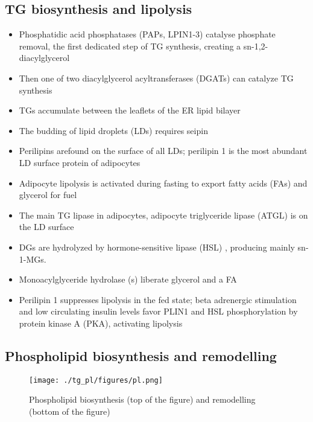 \documentclass{scrartcl}
\begin{document}
\subsection{TG biosynthesis and lipolysis}
\label{sec:orgbe94311}
\begin{itemize}
\item Phosphatidic acid phosphatases (PAPs, LPIN1-3) catalyse phosphate
removal, the first dedicated step of TG synthesis, creating a sn-1,2-diacylglycerol
\item Then one of two diacylglycerol acyltransferases (DGATs) can catalyze TG synthesis
\item TGs accumulate between the leaflets of the ER lipid bilayer
\item The  budding of lipid droplets (LDs) requires seipin
\item Perilipins arefound on the surface of all LDs; perilipin 1 is the most abundant LD surface protein of adipocytes
\item Adipocyte lipolysis is activated during fasting to export fatty
acids (FAs) and glycerol for fuel
\item The main TG lipase in adipocytes, adipocyte triglyceride lipase (ATGL) is on the LD surface
\item DGs are hydrolyzed by hormone-sensitive lipase (HSL) , producing
mainly sn-1-MGs.
\item Monoacylglyceride hydrolase (s) liberate glycerol and a FA
\item Perilipin 1 suppresses lipolysis in the fed state; beta adrenergic
stimulation and low circulating insulin levels favor PLIN1 and HSL
phosphorylation by protein kinase A (PKA), activating lipolysis
\end{itemize}

\subsection{Phospholipid biosynthesis and remodelling}
\label{sec:org20dfe68}
\begin{figure}[htbp]
\centering
\texttt{[image: ./tg\_pl/figures/pl.png]}
\caption{\label{fig:org3abfb1a}
Phospholipid biosynthesis (top of the figure) and remodelling (bottom of the figure)}
\end{figure}
\end{document}
